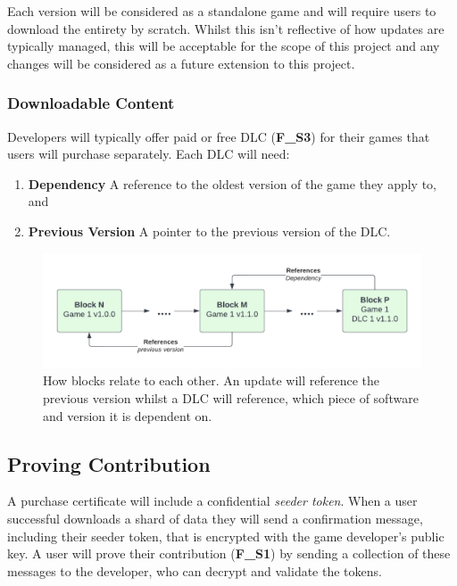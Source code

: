 \vspace{2mm}\noindent Each version will be considered as a standalone game and will require users to download the entirety by scratch. Whilst this isn't reflective of how updates are typically managed, this will be acceptable for the scope of this project and any changes will be considered as a future extension to this project.

\subsubsection*{Downloadable Content}

Developers will typically offer paid or free DLC (\textbf{F\_S3}) for their games that users will purchase separately. Each DLC will need:

\begin{enumerate}
  \item \textbf{Dependency} A reference to the oldest version of the game they apply to, and
  \item \textbf{Previous Version} A pointer to the previous version of the DLC.
\end{enumerate}

\begin{figure}[ht]
  \centering
  \includegraphics[width=.85\textwidth]{assets/images/diagrams/software.png}
  \caption{How blocks relate to each other. An update will reference the previous version whilst a DLC will reference, which piece of software and version it is dependent on.}
\end{figure}

\subsection*{Proving Contribution}

A purchase certificate will include a confidential \textit{seeder token}. When a user successful downloads a shard of data they will send a confirmation message, including their seeder token, that is encrypted with the game developer's public key. A user will prove their contribution (\textbf{F\_S1}) by sending a collection of these messages to the developer, who can decrypt and validate the tokens.
